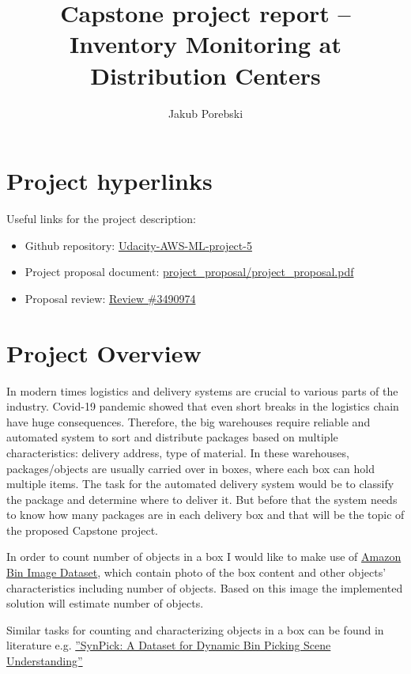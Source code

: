 \documentclass{article}
\title{Capstone project report -- Inventory Monitoring at Distribution Centers}
\author{Jakub Porebski}
\begin{document}
	\maketitle

\section{Project hyperlinks}
Useful links for the project description:
\begin{itemize}
	\item Github repository: \href{https://github.com/jakpor/Udacity-AWS-ML-project-5}{Udacity-AWS-ML-project-5}
	\item Project proposal document: \href{https://github.com/jakpor/Udacity-AWS-ML-project-5/blob/master/project_proposal/project_proposal.pdf}{project\_proposal/project\_proposal.pdf}
	\item Proposal review: \href{https://review.udacity.com/#!/reviews/3490974}{Review \#3490974}
\end{itemize}

\section{Project Overview}
In modern times logistics and delivery systems are crucial to various parts of the industry. Covid-19 pandemic showed that even short breaks in the logistics chain have huge consequences. Therefore, the big warehouses require reliable and automated system to sort and distribute packages based on multiple characteristics: delivery address, type of material. In these warehouses, packages/objects are usually carried over in boxes, where each box can hold multiple items. The task for the automated delivery system would be to classify the package and determine where to deliver it. But before that the system needs to know how many packages are in each delivery box and that will be the topic of the proposed Capstone project.

In order to count number of objects in a box I would like to make use of \href{https://registry.opendata.aws/amazon-bin-imagery/}{Amazon Bin Image Dataset}, which contain photo of the box content and other objects' characteristics including number of objects. Based on this image the implemented solution will estimate number of objects. 

Similar tasks for counting and characterizing objects in a box can be found in literature e.g. \href{https://arxiv.org/pdf/2107.04852.pdf}{''SynPick: A Dataset for Dynamic Bin Picking Scene Understanding''}
\end{document}
